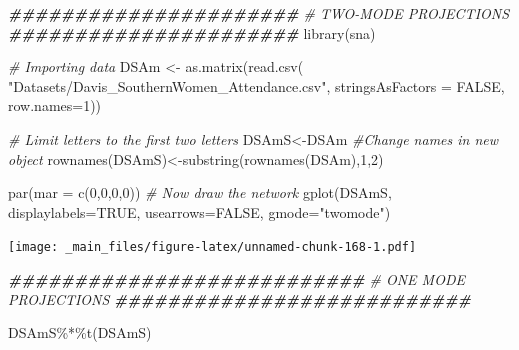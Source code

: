 \documentclass[
  notitlepage,
  onecolumn,
  openany]{book}
\newenvironment{Shaded}{\begin{snugshade}}{\end{snugshade}}
\newcommand{\AttributeTok}[1]{\textcolor[rgb]{0.77,0.63,0.00}{#1}}
\newcommand{\CommentTok}[1]{\textcolor[rgb]{0.56,0.35,0.01}{\textit{#1}}}
\newcommand{\ConstantTok}[1]{\textcolor[rgb]{0.00,0.00,0.00}{#1}}
\newcommand{\DecValTok}[1]{\textcolor[rgb]{0.00,0.00,0.81}{#1}}
\newcommand{\DocumentationTok}[1]{\textcolor[rgb]{0.56,0.35,0.01}{\textbf{\textit{#1}}}}
\newcommand{\FunctionTok}[1]{\textcolor[rgb]{0.00,0.00,0.00}{#1}}
\newcommand{\NormalTok}[1]{#1}
\newcommand{\OtherTok}[1]{\textcolor[rgb]{0.56,0.35,0.01}{#1}}
\newcommand{\SpecialCharTok}[1]{\textcolor[rgb]{0.00,0.00,0.00}{#1}}
\newcommand{\StringTok}[1]{\textcolor[rgb]{0.31,0.60,0.02}{#1}}
\begin{document}
\begin{Shaded}
\begin{Highlighting}[]
\DocumentationTok{\#\#\#\#\#\#\#\#\#\#\#\#\#\#\#\#\#\#\#\#\#\#}
\CommentTok{\# TWO{-}MODE PROJECTIONS}
\DocumentationTok{\#\#\#\#\#\#\#\#\#\#\#\#\#\#\#\#\#\#\#\#\#\#}
\FunctionTok{library}\NormalTok{(sna)}

\CommentTok{\# Importing data}
\NormalTok{DSAm }\OtherTok{\textless{}{-}} \FunctionTok{as.matrix}\NormalTok{(}\FunctionTok{read.csv}\NormalTok{(}
    \StringTok{"Datasets/Davis\_SouthernWomen\_Attendance.csv"}\NormalTok{,}
    \AttributeTok{stringsAsFactors =} \ConstantTok{FALSE}\NormalTok{, }\AttributeTok{row.names=}\DecValTok{1}\NormalTok{))}


\CommentTok{\# Limit letters to the first two letters}
\NormalTok{DSAmS}\OtherTok{\textless{}{-}}\NormalTok{DSAm}
\CommentTok{\#Change names in new object}
\FunctionTok{rownames}\NormalTok{(DSAmS)}\OtherTok{\textless{}{-}}\FunctionTok{substring}\NormalTok{(}\FunctionTok{rownames}\NormalTok{(DSAm),}\DecValTok{1}\NormalTok{,}\DecValTok{2}\NormalTok{)}

\FunctionTok{par}\NormalTok{(}\AttributeTok{mar =} \FunctionTok{c}\NormalTok{(}\DecValTok{0}\NormalTok{,}\DecValTok{0}\NormalTok{,}\DecValTok{0}\NormalTok{,}\DecValTok{0}\NormalTok{))}
\CommentTok{\# Now draw the network}
\FunctionTok{gplot}\NormalTok{(DSAmS, }\AttributeTok{displaylabels=}\ConstantTok{TRUE}\NormalTok{, }
      \AttributeTok{usearrows=}\ConstantTok{FALSE}\NormalTok{, }\AttributeTok{gmode=}\StringTok{"twomode"}\NormalTok{)}
\end{Highlighting}
\end{Shaded}

\texttt{[image: \_main\_files/figure-latex/unnamed-chunk-168-1.pdf]}

\begin{Shaded}
\begin{Highlighting}[]
\DocumentationTok{\#\#\#\#\#\#\#\#\#\#\#\#\#\#\#\#\#\#\#\#\#\#\#\#\#\#\#}
\CommentTok{\# ONE MODE PROJECTIONS}
\DocumentationTok{\#\#\#\#\#\#\#\#\#\#\#\#\#\#\#\#\#\#\#\#\#\#\#\#\#\#\#}

\NormalTok{DSAmS}\SpecialCharTok{\%*\%}\FunctionTok{t}\NormalTok{(DSAmS)}
\end{Highlighting}
\end{Shaded}
\end{document}
